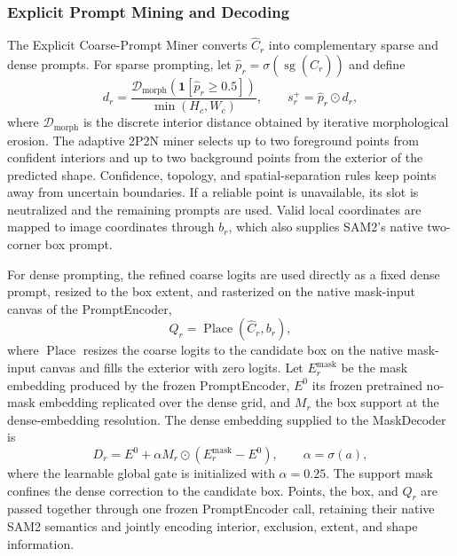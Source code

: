 \documentclass[letterpaper,journal]{IEEEtran}
\begin{document}
\subsubsection{Explicit Prompt Mining and Decoding}
The Explicit Coarse-Prompt Miner converts $\widehat C_r$ into complementary sparse and dense
prompts. For sparse prompting, let $\widehat p_r=\sigma(\operatorname{sg}(\widehat C_r))$ and
define
\begin{equation}
d_r=\frac{\mathcal{D}_{\mathrm{morph}}(\mathbf{1}[\widehat p_r\geq0.5])}{\min(H_c,W_c)},
\qquad s_r^{+}=\widehat p_r\odot d_r,
\label{eq:point_mining_score}
\end{equation}
where $\mathcal{D}_{\mathrm{morph}}$ is the discrete interior distance obtained by iterative
morphological erosion. The adaptive 2P2N miner selects up to two foreground points from
confident interiors and up to two background points from the exterior of the predicted shape.
Confidence, topology, and spatial-separation rules keep points away from uncertain boundaries.
If a reliable point is unavailable, its slot is neutralized and the remaining prompts are used.
Valid local coordinates are mapped to image coordinates through $b_r$, which also supplies
SAM2's native two-corner box prompt.

For dense prompting, the refined coarse logits are used directly as a fixed dense prompt,
resized to the box extent, and rasterized on the native mask-input canvas of the PromptEncoder,
\begin{equation}
Q_r=\operatorname{Place}(\widehat C_r,b_r),
\label{eq:dense_canvas}
\end{equation}
where $\operatorname{Place}$ resizes the coarse logits to the candidate box on the native
mask-input canvas and fills the exterior with zero logits. Let $E_r^{\mathrm{mask}}$ be the
mask embedding produced by the frozen PromptEncoder, $E^0$ its frozen pretrained no-mask
embedding replicated over the dense grid, and $M_r$ the box support at the dense-embedding
resolution. The dense embedding supplied to the MaskDecoder is
\begin{equation}
D_r=E^0+\alpha M_r\odot
\left(E_r^{\mathrm{mask}}-E^0\right),
\qquad \alpha=\sigma(a),
\label{eq:dense_prompt_gate}
\end{equation}
where the learnable global gate is initialized with $\alpha=0.25$. The support mask confines
the dense correction to the candidate box. Points, the box, and $Q_r$ are passed together
through one frozen PromptEncoder call, retaining their native SAM2 semantics and jointly
encoding interior, exclusion, extent, and shape information.
\end{document}
